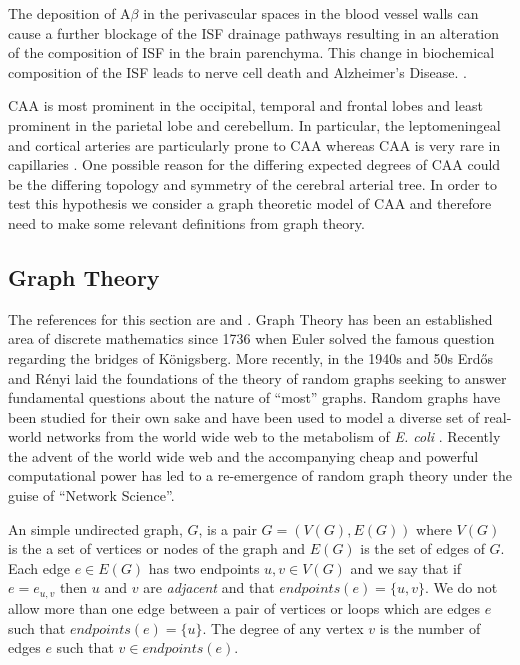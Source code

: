 \documentclass[12pt]{article} %
\theoremstyle{definition}
\begin{document}
The deposition of A$\beta$ in the perivascular spaces in the  blood vessel walls can cause a further blockage of the ISF drainage pathways resulting in an alteration of the composition of ISF in the brain parenchyma. This change in biochemical composition of the ISF leads to nerve cell death and Alzheimer's Disease. \cite{Rox}.  

CAA  is most prominent in the occipital, temporal and frontal lobes and least prominent in the parietal lobe and cerebellum.  In particular,  the leptomeningeal and cortical arteries are particularly prone to CAA whereas CAA is very rare in capillaries \cite{Preston}.  One possible reason for the differing expected degrees of CAA could be the differing topology and symmetry of the cerebral arterial tree.  In order to test this hypothesis we consider a graph theoretic model of CAA and therefore need to make some relevant definitions from graph theory.  







\subsection{Graph Theory}\label{trees}  The references for this section are \cite{Bela} 
and \cite{varietiesofincreasintrees}.
Graph Theory has been an established area of discrete mathematics since 1736 when Euler 
solved the famous question regarding the bridges of K\"{o}nigsberg.  More recently, in the 
1940s and 50s Erd\H{o}s and R\'{e}nyi laid the foundations of the theory of random graphs 
seeking to answer fundamental questions about the nature of ``most'' graphs. Random graphs 
have been studied for their own sake and have been used to model a diverse set of real-world 
networks from the world wide web to the metabolism of \emph{E. coli} \cite{barabasi}. Recently the advent of the world wide web and the accompanying %
cheap and powerful computational power has led to a re-emergence of  
random graph theory under the guise of ``Network Science''. 

An simple undirected graph, $G$, is a pair $G = (V(G),E(G))$ where $V(G)$ is the a set of vertices or nodes of the graph and $E(G)$ is 
the set of edges of $G$.  Each edge $e \in E(G)$ has two endpoints $u,v \in V(G)$ and we say that if $e = e_{u,v}$ then $u$ and $v$ are \emph{adjacent} and that $endpoints(e) = \{u,v\}$.  We do not allow more than one edge between a pair of vertices or loops which are edges $e$ such that $endpoints(e) = \{u\}$. The degree of any vertex $v$ is the number of edges $e$ such that $v \in endpoints(e)$. 
\end{document}
